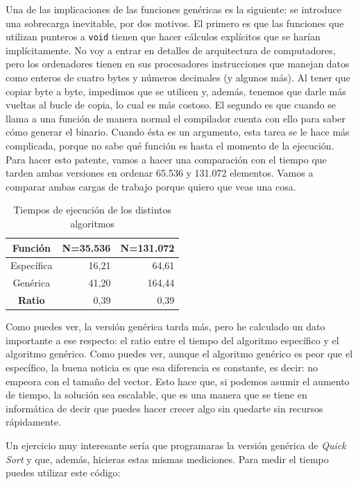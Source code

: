 \documentclass[a4paper]{article}
\begin{document}
Una de las implicaciones de las funciones genéricas es la siguiente: se
introduce una sobrecarga inevitable, por dos motivos. El primero es que las
funciones que utilizan punteros a \verb!void! tienen que hacer cálculos
explícitos que se harían implícitamente. No voy a entrar en detalles de
arquitectura de computadores, pero los ordenadores tienen en sus procesadores
instrucciones que manejan datos como enteros de cuatro bytes y números decimales
(y algunos más). Al tener que copiar byte a byte, impedimos que se utilicen y,
además, tenemos que darle más vueltas al bucle de copia, lo cual es más costoso.
El segundo es que cuando se llama a una función de manera normal el
compilador cuenta con ello para saber cómo generar el binario. Cuando ésta
es un argumento, esta tarea se le hace más complicada, porque no sabe qué
función es hasta el momento de la ejecución. Para hacer esto patente, vamos
a hacer una comparación con el tiempo que tarden ambas versiones en ordenar
65.536 y 131.072 elementos. Vamos a comparar ambas cargas de trabajo porque
quiero que veas una cosa.

\begin{table}[H]
\begin{tabularx}{\linewidth}{|c|R|R|}
\hline
\textbf{Función}&\textbf{N=35.536}&\textbf{N=131.072}\\\hline
Específica&16,21&64,61\\\hline
Genérica&41,20&164,44\\\hline
\textbf{Ratio}&0,39&0,39\\\hline
\end{tabularx}
\caption{Tiempos de ejecución de los distintos algoritmos}
\label{tab:sortingTimes}
\end{table}

Como puedes ver, la versión genérica tarda más, pero he calculado un dato
importante a ese respecto: el ratio entre el tiempo del algoritmo específico y
el algoritmo genérico. Como puedes ver, aunque el algoritmo genérico es peor
que el específico, la buena noticia es que esa diferencia es constante, es
decir: no empeora con el tamaño del vector. Esto hace que, si podemos asumir
el aumento de tiempo, la solución sea escalable, que es una manera que se tiene
en informática de decir que puedes hacer crecer algo sin quedarte sin recursos
rápidamente.

Un ejercicio muy interesante sería que programaras la versión genérica de
\textit{Quick Sort} y que, además, hicieras estas mismas mediciones. Para
medir el tiempo puedes utilizar este código:
\end{document}
